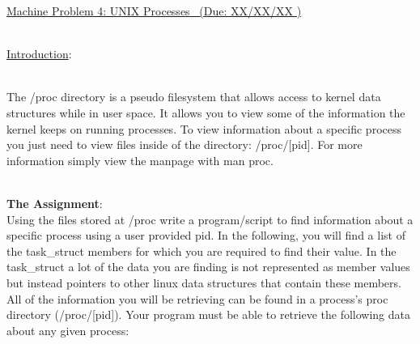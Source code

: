 \documentclass[12pt]{extarticle}
\newcommand{\duedate}{XX/XX/XX }
\begin{document}
\begin{center}
    \underline{{\large Machine Problem 4: UNIX Processes \  }(Due: \duedate)}  \\
\end{center}


\ \\
{\large \underline{Introduction}:}

\ \\
The /proc directory is a pseudo filesystem that allows access to kernel data structures while in user space. It allows you to view some of the information the kernel keeps on running processes. To view information about a specific process you just need to view files inside of the directory: /proc/[pid]. For more information simply view the manpage with man proc.  

\ \\
{\large \textbf{The Assignment}:} \newline
\ \\
Using the files stored at /proc write a program/script to find information about a specific process using a user provided pid. In the following, you will find a list of the task\_struct members for which you are required to find their value. In the task\_struct a lot of the data you are finding is not represented as member values but instead pointers to other linux data structures that contain these members. All of the information you will be retrieving can be found in a process’s proc directory (/proc/[pid]).  Your program must be able to retrieve the following data about any given process:  
\end{document}
